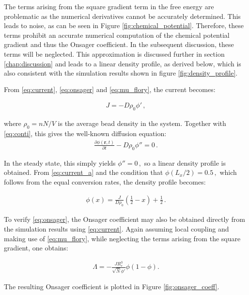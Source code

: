 \documentclass[bachelor,       %
               twoside,        %
               BCOR10mm,       %
                ngerman,english  %
               ]{GAUBM}
\begin{document}
The terms arising from the square gradient term in the free energy are problematic as the numerical derivatives cannot be accurately determined. This leads to noise, as can be seen in Figure \ref{fig:chemical_potential}. Therefore, these terms prohibit an accurate numerical computation of the chemical potential gradient and thus the Onsager coefficient. In the subsequent discussion, these terms will be neglected. This approximation is discussed further in section \ref{chap:discussion} and leads to a linear density profile, as derived below, which is also consistent with the simulation results shown in figure \ref{fig:density_profile}.

From \eqref{eq:current}, \eqref{eq:onsager} and \eqref{eq:mu_flory}, the current becomes:


\begin{align}
  J=-D\rho_0\phi'\,,
  \label{eq:current_a}
\end{align}



where $\rho_0=nN/V$ is the average bead density in the system. Together with \eqref{eq:conti}, this gives the well-known diffusion equation:
\begin{align}
  \frac{\partial\phi(\mathbf r, t)}{\partial t}-D\rho_0  \phi''=0\,.
  \label{eq:diffusion}
\end{align}

In the steady state, this simply yields $\phi''=0\,,$ so a linear density profile is obtained. From \eqref{eq:current_a} and the condition that $\phi(L_x/2)=0.5\,,$ which follows from the equal conversion rates, the density profile becomes:

\begin{align}
  \phi(x)=\frac{J}{D\rho_0}\left(\frac{1}{2}-x\right) + \frac{1}{2}\,.
  \label{eq:density_profile_ana}
\end{align}

To verify \eqref{eq:onsager}, the Onsager coefficient may also be obtained directly from the simulation results using \eqref{eq:current}. Again assuming local coupling and making use of \eqref{eq:mu_flory}, while neglecting the terms arising from the square gradient, one obtains:

\begin{align}
  \Lambda=-\frac{JR_e^3}{\sqrt{\bar N}\phi'}\phi(1-\phi).
  \label{eq:onsager_num}
\end{align}

The resulting Onsager coefficient is plotted in Figure \ref{fig:onsager_coeff}.
\end{document}
